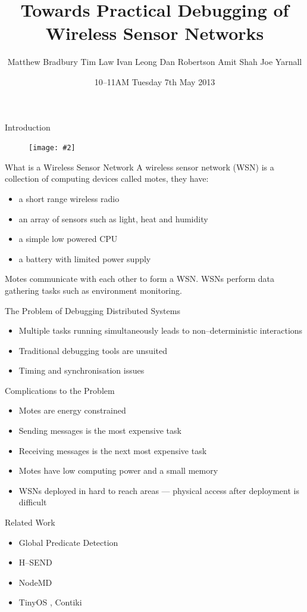 \documentclass[usenames,dvipsnames]{beamer}
\title{Towards Practical Debugging of Wireless Sensor Networks}
\author[Bradbury, Law, Leong, Robertson, Shah, Yarnall]{Matthew Bradbury\newline
Tim Law\newline
Ivan Leong\newline
Dan Robertson\newline
Amit Shah\newline
Joe Yarnall}
\institute{CS407: Fourth Year Project}
\date{10--11AM Tuesday 7th May 2013}
\newcommand{\subtitleframeimage}[2]{\begin{frame}\begin{block}{\centering\Large \vspace{1em} #1 \vspace{1em} }\end{block}\begin{figure}[H]\centering\texttt{[image: \#2]}\end{figure}\end{frame}}
\begin{document}
\begin{frame}
\titlepage
\end{frame}

\subtitleframeimage{Introduction}{../Report/Images/CM5000.jpg}

\begin{frame}{What is a Wireless Sensor Network}
A wireless sensor network (WSN) is a collection of computing devices called motes, they have:
	\begin{itemize}
		\item a short range wireless radio
		\item an array of sensors such as light, heat and humidity
		\item a simple low powered CPU
		\item a battery with limited power supply
	\end{itemize}
Motes communicate with each other to form a WSN.
WSNs perform data gathering tasks such as environment monitoring.
\end{frame}

\begin{frame}{The Problem of Debugging Distributed Systems}
	\begin{itemize}
		\item Multiple tasks running simultaneously leads to non--deterministic interactions
		\item Traditional debugging tools are unsuited
		\item Timing and synchronisation issues
	\end{itemize}
\end{frame}

\begin{frame}{Complications to the Problem}
	\begin{itemize}
		\item Motes are energy constrained
		\item Sending messages is the most expensive task
		\item Receiving messages is the next most expensive task \cite{Shnayder04}
		\item Motes have low computing power and a small memory
		\item WSNs deployed in hard to reach areas --- physical access after deployment is difficult \cite{herbert2007adaptive}
	\end{itemize}
\end{frame}

\begin{frame}{Related Work}
	\begin{itemize}
		\item Global Predicate Detection \cite{553309}
		\item H--SEND \cite{herbert2007adaptive}
		\item NodeMD \cite{NodeMD}
		\item TinyOS \cite{tinyos}, Contiki
	\end{itemize}
\end{frame}
\end{document}
